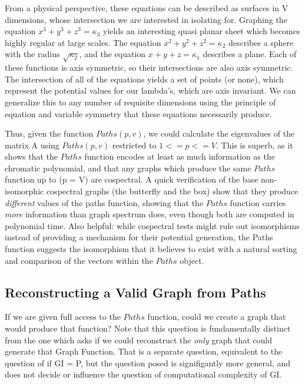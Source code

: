 \documentclass[11pt,a4paper]{report}
\begin{document}
From a physical perspective, these equations can be described as surfaces in V dimensions, whose intersection we are interested in isolating for. 
Graphing the equation $x^3 + y^3 + z^3 = \kappa_3$ yields an interesting quasi planar sheet which becomes highly regular at large scales.  
The equation $x^2 + y^2 + z^2 = \kappa_2$ describes a sphere with the radius $\sqrt{\kappa_2}$, and the equation $x + y + z = \kappa_1$ describes a plane. 
Each of these functions is axis symmetric, so their intersections are also axis symmetric.  
The intersection of all of the equations yields a set of points (or none), which represent the potential values for our lambda's, which are axis invariant. 
We can generalize this to any number of requisite dimensions using the principle of equation and variable symmetry that these equations necessarily produce.

Thus, given the function $Paths(p, v)$, we could calculate the eigenvalues of the matrix A using $Paths(p, v)$ restricted to $1 <= p <= V$. 
This is superb, as it shows that the $Paths$ function encodes at least as much information as the chromatic polynomial, and that any graphs which produce the same $Paths$ function up to (p = V) are cospectral. 
A quick verification of the base non-isomorphic cospectral graphs (the butterfly and the box) show that they produce \emph{different} values of the paths function, showing that the $Paths$ function carries \emph{more} information than graph spectrum does, even though both are computed in polynomial time. 
Also helpful: while cospectral tests might rule out isomorphisms instead of providing a mechanism for their potential generation, the Paths function suggests the isomorphism that it believes to exist with a natural sorting and comparison of the vectors within the $Paths$ object.

\subsection{Reconstructing a Valid Graph from Paths}
If we are given full access to the $Paths$ function, could we create a graph that would produce that function?
Note that this question is fundamentally distinct from the one which asks if we could reconstruct the \emph{only} graph that could generate that Graph Function.
That is a separate question, equivalent to the question of if GI = P, but the question posed is signifigantly more general, and does not decide or influence the question of computational complexity of GI.
\end{document}
